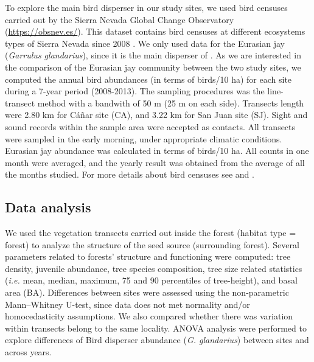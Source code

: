 To explore the main bird disperser in our study sites, we used bird censuses carried out by the Sierra Nevada Global Change Observatory (\href{https://obsnev.es/}{https://obsnev.es/}). This dataset contains bird censuses at different ecosystems types of Sierra Nevada since 2008 \autocites[for more details see][]{BareaAzconetal2012PasseriformesOtrasa, PerezLuqueetal2016DatasetPasserine}. We only used data for the Eurasian jay (\emph{Garrulus glandarius}), since it is the main disperser of \Qpy \autocites{Gomez2003ImpactVertebrate}. As we are interested in the comparison of the Eurasian jay community between the two study sites, we computed the annual bird abundances (in terms of birds/10 ha) for each site during a 7-year period (2008-2013). The sampling procedures was the line-transect method with a bandwith of 50 m (25 m on each side). Transects length were 2.80 km for Cáñar site (CA), and 3.22 km for San Juan site (SJ). Sight and sound records within the sample area were accepted as contacts. All transects were sampled in the early morning, under appropriate climatic conditions. Eurasian jay abundance was calculated in terms of birds/10 ha. All counts in one month were averaged, and the yearly result was obtained from the average of all the months studied. For more details about bird censuses see \citet{BareaAzconetal2012PasseriformesOtrasa} and \citet{ZamoraBareaAzcon2015LongTermChanges}.

\subsection{Data analysis}\label{sec:coloniza:analysis}
We used the vegetation transects carried out inside the forest (habitat type = forest) to analyze the structure of the seed source (surrounding forest). Several parameters related to forests' structure and functioning were computed: tree density, juvenile abundance, tree species composition, tree size related statistics (\emph{i.e.} mean, median, maximum, 75 and 90 percentiles of tree-height), and basal area (BA). Differences between sites were assessed using the non-parametric Mann–Whitney U-test, since data does not met normality and/or homocedasticity assumptions. We also compared whether there was variation within transects belong to the same locality. ANOVA analysis were performed to explore differences of Bird disperser abundance (\emph{G. glandarius}) between sites and across years. 

